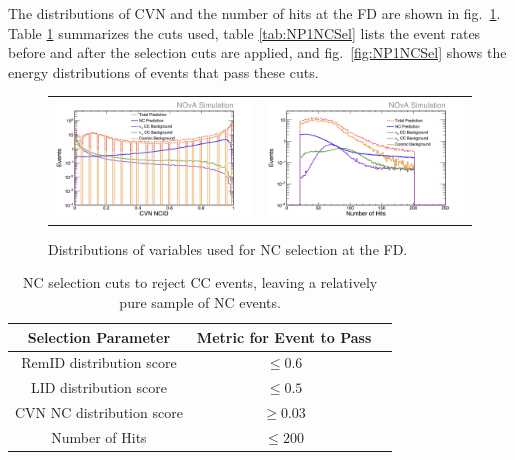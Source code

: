 The distributions of CVN and the number of hits at the FD are shown in fig.~\ref{fig:NCSel}. Table \ref{tab:NCSel} summarizes the cuts used, table \ref{tab:NP1NCSel} lists the event rates before and after the selection cuts are applied, and fig.~\ref{fig:NP1NCSel} shows the energy distributions of events that pass these cuts.
\begin{figure}[h]
  \centering
  \begin{tabular}{c c}
    \includegraphics[width=.48\textwidth]{figures/NP1CVNC.png} &
    \includegraphics[width=.48\textwidth]{figures/NP1NHit.png} \\
  \end{tabular}
  \caption[NC Selection Variable Distributions]{Distributions of variables used for NC selection at the FD.}
  \label{fig:NCSel}
\end{figure}

\begin{table}[h]
  \begin{center}
    \caption[NC Selection Cuts]{NC selection cuts to reject CC events, leaving a relatively pure sample of NC events.}
    \label{tab:NCSel}
    \begin{tabular}{c c c}
      \hline\hline
      Selection Parameter & Metric for Event to Pass \\
      \hline
      RemID distribution score & $\leq 0.6$ \\
      LID distribution score & $\leq 0.5$ \\
      CVN NC distribution score & $\geq 0.03$ \\
      Number of Hits & $\leq 200$ \\
      \hline
    \end{tabular}
  \end{center}
\end{table}

